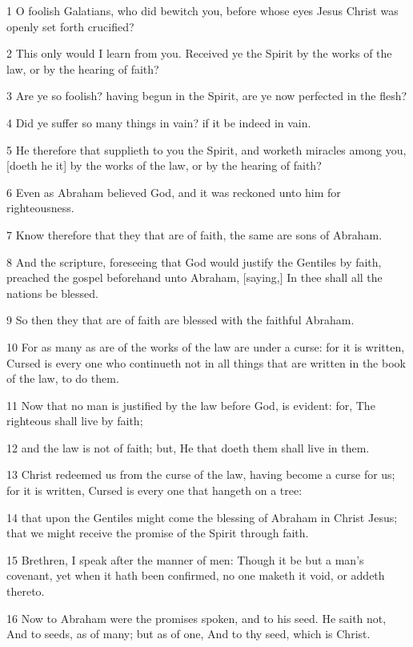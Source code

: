 \par 1 O foolish Galatians, who did bewitch you, before whose eyes Jesus Christ was openly set forth crucified?
\par 2 This only would I learn from you. Received ye the Spirit by the works of the law, or by the hearing of faith?
\par 3 Are ye so foolish? having begun in the Spirit, are ye now perfected in the flesh?
\par 4 Did ye suffer so many things in vain? if it be indeed in vain.
\par 5 He therefore that supplieth to you the Spirit, and worketh miracles among you, [doeth he it] by the works of the law, or by the hearing of faith?
\par 6 Even as Abraham believed God, and it was reckoned unto him for righteousness.
\par 7 Know therefore that they that are of faith, the same are sons of Abraham.
\par 8 And the scripture, foreseeing that God would justify the Gentiles by faith, preached the gospel beforehand unto Abraham, [saying,] In thee shall all the nations be blessed.
\par 9 So then they that are of faith are blessed with the faithful Abraham.
\par 10 For as many as are of the works of the law are under a curse: for it is written, Cursed is every one who continueth not in all things that are written in the book of the law, to do them.
\par 11 Now that no man is justified by the law before God, is evident: for, The righteous shall live by faith;
\par 12 and the law is not of faith; but, He that doeth them shall live in them.
\par 13 Christ redeemed us from the curse of the law, having become a curse for us; for it is written, Cursed is every one that hangeth on a tree:
\par 14 that upon the Gentiles might come the blessing of Abraham in Christ Jesus; that we might receive the promise of the Spirit through faith.
\par 15 Brethren, I speak after the manner of men: Though it be but a man's covenant, yet when it hath been confirmed, no one maketh it void, or addeth thereto.
\par 16 Now to Abraham were the promises spoken, and to his seed. He saith not, And to seeds, as of many; but as of one, And to thy seed, which is Christ.
